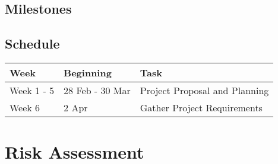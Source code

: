 \documentclass[a4paper]{article}
\begin{document}
\subsection{Milestones}
\subsection{Schedule}
\begin{tabular} { l | l || l }
	Week & Beginning & Task \\
	\hline
	Week 1 - 5 & 28 Feb - 30 Mar & Project Proposal and Planning \\
	Week 6      & 2 Apr           & Gather Project Requirements   
\end{tabular}
\section{Risk Assessment}

\newpage


\end{document}
